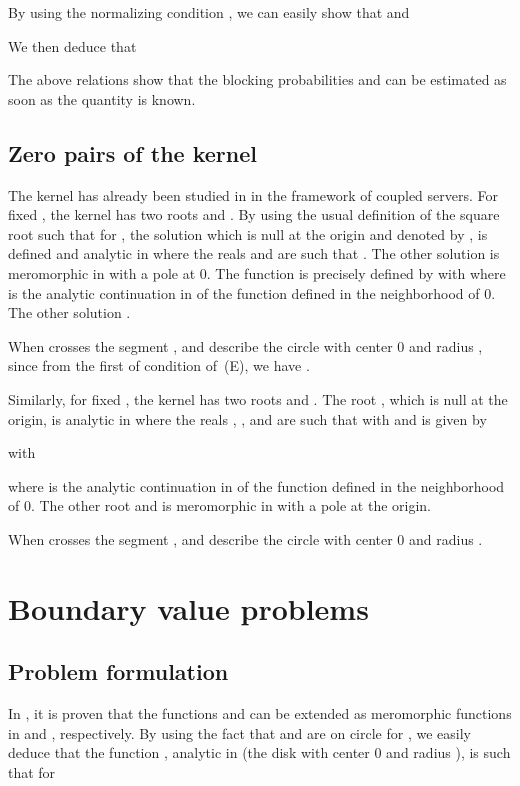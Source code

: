 \documentclass{amsart}
\begin{document}
By using the normalizing condition , we can easily show that  and 

We then deduce that 

The above relations show that the blocking probabilities  and  can be estimated as soon as the quantity  is known.

\subsection{Zero pairs of the kernel}

The kernel  has already been studied in \cite{FayolleIas} in the framework of coupled servers. For fixed , the kernel  has two roots  and . By using the usual definition of the square root such that  for , the solution which is null at the origin and denoted by , is defined and analytic in  where the reals  and  are such that . The other solution  is meromorphic in  with a pole at 0. The function  is precisely defined by
 with 
where  is the analytic continuation in  of the function  defined in the neighborhood of 0. The other solution .

When  crosses the segment ,  and  describe the circle  with center 0 and radius , since from the first of condition of~(E), we have .

Similarly, for fixed , the kernel  has two roots  and . The root , which is null at the origin, is analytic in  where the reals , ,  and  are such that with  and is given by

with

where  is the analytic continuation in   of the function  defined in the neighborhood of 0.  The other root  and is meromorphic in  with a pole at the origin. 

When  crosses the segment ,  and  describe the circle  with center 0 and radius .

\section{Boundary value problems}\label{BoundValue}

\subsection{Problem formulation}

In \cite{FIM}, it is proven that the functions  and  can be extended as meromorphic functions in  and , respectively. By using the fact that  and  are on circle  for , we easily deduce that the function , analytic in  (the disk with center 0 and radius ), is such that for  
\end{document}
